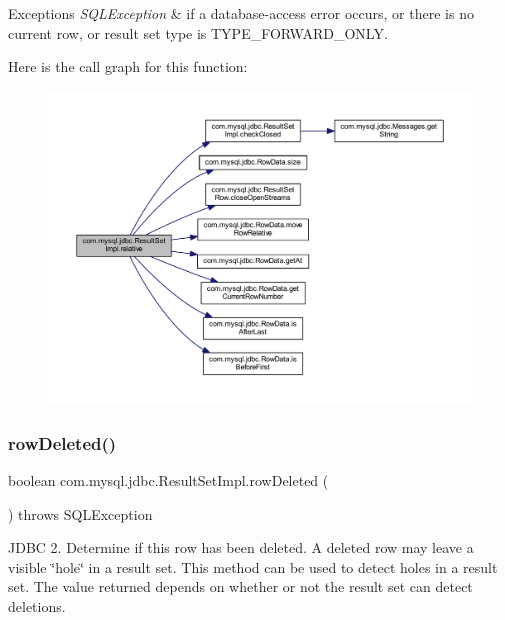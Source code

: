 \begin{DoxyExceptions}{Exceptions}
{\em S\+Q\+L\+Exception} & if a database-\/access error occurs, or there is no current row, or result set type is T\+Y\+P\+E\+\_\+\+F\+O\+R\+W\+A\+R\+D\+\_\+\+O\+N\+LY. \\
\hline
\end{DoxyExceptions}
Here is the call graph for this function\+:
\nopagebreak
\begin{figure}[H]
\begin{center}
\leavevmode
\includegraphics[width=350pt]{classcom_1_1mysql_1_1jdbc_1_1_result_set_impl_a0b651b9e4f93639c884c9625b6776733_cgraph}
\end{center}
\end{figure}
\mbox{\label{classcom_1_1mysql_1_1jdbc_1_1_result_set_impl_a1b064fbd329b324c8acac4a7ef61d4b4}} 
\subsubsection{\texorpdfstring{row\+Deleted()}{rowDeleted()}}
{\footnotesize\ttfamily boolean com.\+mysql.\+jdbc.\+Result\+Set\+Impl.\+row\+Deleted (\begin{DoxyParamCaption}{ }\end{DoxyParamCaption}) throws S\+Q\+L\+Exception}

J\+D\+BC 2. Determine if this row has been deleted. A deleted row may leave a visible \char`\"{}hole\char`\"{} in a result set. This method can be used to detect holes in a result set. The value returned depends on whether or not the result set can detect deletions.

